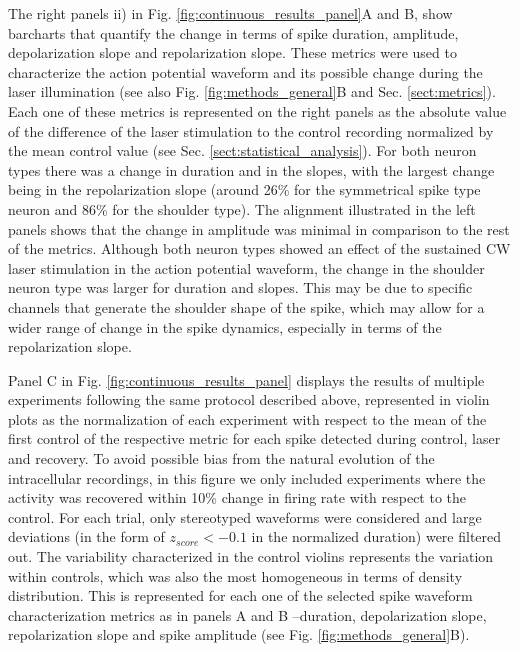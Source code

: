 The right panels ii) in Fig. \ref{fig:continuous_results_panel}A and B, show barcharts that quantify the change in terms of spike duration, amplitude, depolarization slope and repolarization slope. These metrics were used to characterize the action potential waveform and its possible change during the laser illumination (see also Fig. \ref{fig:methods_general}B and Sec. \ref{sect:metrics}). Each one of these metrics is represented on the right panels as the absolute value of the difference of the laser stimulation to the control recording normalized by the mean control value (see Sec. \ref{sect:statistical_analysis}). For both neuron types there was a change in duration and in the slopes, with the largest change being in the repolarization slope (around 26\% for the symmetrical spike type neuron and 86\% for the shoulder type). The alignment illustrated in the left panels shows that the change in amplitude was minimal in comparison to the rest of the metrics. Although both neuron types showed an effect of the sustained CW laser stimulation in the action potential waveform, the change in the shoulder neuron type was larger for duration and slopes. This may be due to specific channels that generate the shoulder shape of the spike, which may allow for a wider range of change in the spike dynamics, especially in terms of the repolarization slope. 


Panel C in Fig. \ref{fig:continuous_results_panel} displays the results of multiple experiments following the same protocol described above, represented in violin plots as the normalization of each experiment with respect to the mean of the first control of the respective metric for each spike detected during control, laser and recovery. To avoid possible bias from the natural evolution of the intracellular recordings, in this figure we only included experiments where the activity was recovered within 10\% change in firing rate with respect to the control. For each trial, only stereotyped waveforms were considered and large deviations (in the form of $z_{score} < -0.1$ in the normalized duration) were filtered out. The variability characterized in the control violins represents the variation within controls, which was also the most homogeneous in terms of density distribution. This is represented for each one of the selected spike waveform characterization metrics as in panels A and B --duration, depolarization slope, repolarization slope and spike amplitude (see Fig. \ref{fig:methods_general}B).


